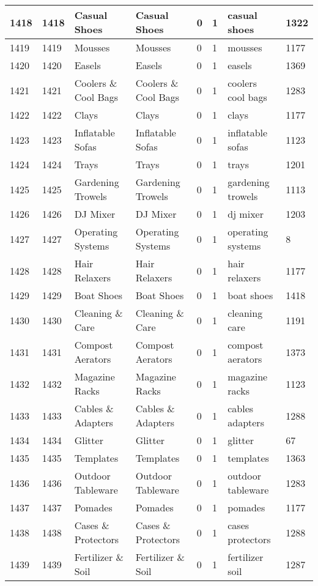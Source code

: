 \begin{longtable}{|l|l|l|l|l|l|l|l|}
1418 & 1418 & Casual Shoes & Casual Shoes & 0 & 1 & casual shoes & 1322 \\ \hline 
1419 & 1419 & Mousses & Mousses & 0 & 1 & mousses & 1177 \\ \hline 
1420 & 1420 & Easels & Easels & 0 & 1 & easels & 1369 \\ \hline 
1421 & 1421 & Coolers \& Cool Bags & Coolers \& Cool Bags & 0 & 1 & coolers cool bags & 1283 \\ \hline 
1422 & 1422 & Clays & Clays & 0 & 1 & clays & 1177 \\ \hline 
1423 & 1423 & Inflatable Sofas & Inflatable Sofas & 0 & 1 & inflatable sofas & 1123 \\ \hline 
1424 & 1424 & Trays & Trays & 0 & 1 & trays & 1201 \\ \hline 
1425 & 1425 & Gardening Trowels & Gardening Trowels & 0 & 1 & gardening trowels & 1113 \\ \hline 
1426 & 1426 & DJ Mixer & DJ Mixer & 0 & 1 & dj mixer & 1203 \\ \hline 
1427 & 1427 & Operating Systems & Operating Systems & 0 & 1 & operating systems & 8 \\ \hline 
1428 & 1428 & Hair Relaxers & Hair Relaxers & 0 & 1 & hair relaxers & 1177 \\ \hline 
1429 & 1429 & Boat Shoes & Boat Shoes & 0 & 1 & boat shoes & 1418 \\ \hline 
1430 & 1430 & Cleaning \& Care & Cleaning \& Care & 0 & 1 & cleaning care & 1191 \\ \hline 
1431 & 1431 & Compost Aerators & Compost Aerators & 0 & 1 & compost aerators & 1373 \\ \hline 
1432 & 1432 & Magazine Racks & Magazine Racks & 0 & 1 & magazine racks & 1123 \\ \hline 
1433 & 1433 & Cables \& Adapters & Cables \& Adapters & 0 & 1 & cables adapters & 1288 \\ \hline 
1434 & 1434 & Glitter & Glitter & 0 & 1 & glitter & 67 \\ \hline 
1435 & 1435 & Templates & Templates & 0 & 1 & templates & 1363 \\ \hline 
1436 & 1436 & Outdoor Tableware & Outdoor Tableware & 0 & 1 & outdoor tableware & 1283 \\ \hline 
1437 & 1437 & Pomades & Pomades & 0 & 1 & pomades & 1177 \\ \hline 
1438 & 1438 & Cases \& Protectors & Cases \& Protectors & 0 & 1 & cases protectors & 1288 \\ \hline 
1439 & 1439 & Fertilizer \& Soil & Fertilizer \& Soil & 0 & 1 & fertilizer soil & 1287 \\ \hline 

\end{longtable}
